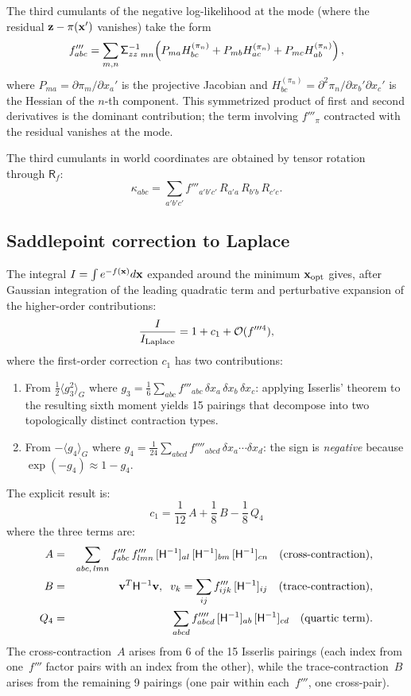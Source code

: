 \documentclass[journal]{IEEEtran}
\newcommand{\sfSigma}[1]{\mathsf{\Sigma}_\mathnormal{#1}}
\newcommand{\beq}{\begin{equation}}
\newcommand{\eeq}{\end{equation}}
\newcommand{\beqar}{\begin{eqnarray}}
\newcommand{\eeqar}{\end{eqnarray}}
\begin{document}
The third cumulants of the negative log-likelihood at the mode
(where the residual ${\bf z} - \pi({\bf x}')$ vanishes) take the form
\beq
    f'''_{abc} = \sum_{m,n} {\sfSigma{zz}^{-1}}_{mn}\!\left(
    P_{ma} H^{(\pi_n)}_{bc} + P_{mb} H^{(\pi_n)}_{ac} + P_{mc} H^{(\pi_n)}_{ab}
    \right),
    \label{eq:thirdNLL}
\eeq
where $P_{ma} = \partial\pi_m/\partial x_a'$ is the projective Jacobian and
$H^{(\pi_n)}_{bc} = \partial^2\pi_n/\partial x_b'\partial x_c'$ is the Hessian
of the $n$-th component.
This symmetrized product of first and second derivatives is the dominant
contribution; the term involving $f'''_\pi$ contracted with the residual
vanishes at the mode.

The third cumulants in world coordinates 
are obtained by tensor rotation through $\mathsf{R}_f$:
\beq
    \kappa_{abc} = \sum_{a'b'c'} f'''_{a'b'c'}
    \, R_{a'a}\, R_{b'b}\, R_{c'c}.
    \label{eq:thirdcumulants}
\eeq

\subsection{Saddlepoint correction to Laplace}

The integral $I = \int e^{-f({\bf x})} d{\bf x}$ expanded around
the minimum ${\bf x}_{\rm opt}$ gives, after Gaussian integration
of the leading quadratic term and perturbative expansion of the
higher-order contributions:
\beq
    \frac{I}{I_{\rm Laplace}} = 1 + c_1 + \mathcal{O}(f'''^4),
    \label{eq:saddlepointfull}
\eeq
where the first-order correction $c_1$ has two contributions:
\begin{enumerate}
\item From $\frac{1}{2}\langle g_3^2 \rangle_G$ where
$g_3 = \frac{1}{6}\sum_{abc} f'''_{abc}\,\delta x_a\,\delta x_b\,\delta x_c$:
applying Isserlis' theorem to the resulting sixth moment
yields 15 pairings that decompose into two topologically
distinct contraction types.
\item From $-\langle g_4 \rangle_G$ where
$g_4 = \frac{1}{24}\sum_{abcd} f''''_{abcd}\,\delta x_a\cdots\delta x_d$:
the sign is \emph{negative} because $\exp(-g_4) \approx 1 - g_4$.
\end{enumerate}
The explicit result is:
\beq
    \boxed{
    c_1 = \frac{1}{12}\,A + \frac{1}{8}\,B - \frac{1}{8}\,Q_4
    }
    \label{eq:saddlepointcorrection}
\eeq
where the three terms are:
\beqar
    A &=& \sum_{abc,\,lmn} f'''_{abc}\, f'''_{lmn}\,
    [\mathsf{H}^{-1}]_{al}\,[\mathsf{H}^{-1}]_{bm}\,[\mathsf{H}^{-1}]_{cn}
    \quad \mbox{(cross-contraction)}, \nonumber \\
    B &=& {\bf v}^T \mathsf{H}^{-1} {\bf v}, \;\;
    v_k = \sum_{ij} f'''_{ijk}\, [\mathsf{H}^{-1}]_{ij}
    \quad \mbox{(trace-contraction)}, \label{eq:ABQ4} \\
    Q_4 &=& \sum_{abcd} f''''_{abcd}\, [\mathsf{H}^{-1}]_{ab}\,[\mathsf{H}^{-1}]_{cd}
    \quad \mbox{(quartic term)}. \nonumber
\eeqar
The cross-contraction~$A$ arises from 6 of the 15 Isserlis pairings
(each index from one~$f'''$ factor pairs with an index from the other),
while the trace-contraction~$B$ arises from the remaining 9 pairings
(one pair within each~$f'''$, one cross-pair).
\end{document}
